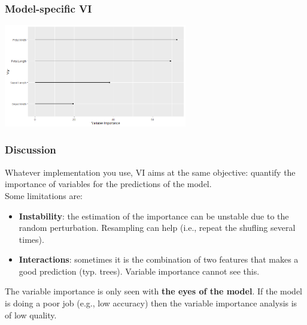 \begin{frame}
\frametitle{Model-specific VI}
\begin{center}
\includegraphics[width=8cm]{../Graphs/VI_iris_rp.png}
\end{center}
\end{frame}
\begin{frame}
\frametitle{Discussion}
Whatever implementation you use, VI aims at the same objective: quantify the importance of variables for the predictions of the model.\\
\vspace{0.3cm}
Some limitations are:
\begin{itemize}
\item {\bf Instability}: the estimation of the importance can be unstable due to the random perturbation. Resampling can help (i.e., repeat the shufling several times). 
\item {\bf Interactions}: sometimes it is the combination of two features that makes a good prediction (typ. trees). Variable importance cannot see this. 
\end{itemize}
The variable importance is only seen with {\bf the eyes of the model}. If the model is doing a poor job (e.g., low accuracy) then the variable importance analysis is of low quality.
\end{frame}
